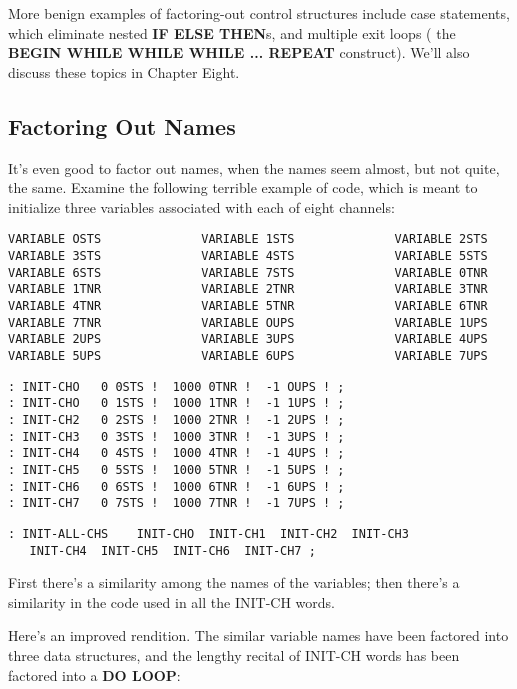 \documentclass{book}
\begin{document}
More benign examples of factoring-out control structures include case statements, which eliminate nested \textbf{IF ELSE THEN}s, and multiple exit loops ( the \textbf{BEGIN WHILE WHILE WHILE ... REPEAT} construct). We'll also discuss these topics in Chapter Eight.

\subsection*{
	\textbf{Factoring Out Names}}

It's even good to factor out names, when the names seem almost, but not quite, the same. Examine the following terrible example of code, which is meant to initialize three variables associated with each of eight channels:

\begin{verbatim} 
VARIABLE OSTS              VARIABLE 1STS              VARIABLE 2STS 
VARIABLE 3STS              VARIABLE 4STS              VARIABLE 5STS
VARIABLE 6STS              VARIABLE 7STS              VARIABLE 0TNR
VARIABLE 1TNR              VARIABLE 2TNR              VARIABLE 3TNR
VARIABLE 4TNR              VARIABLE 5TNR              VARIABLE 6TNR
VARIABLE 7TNR              VARIABLE OUPS              VARIABLE 1UPS
VARIABLE 2UPS              VARIABLE 3UPS              VARIABLE 4UPS
VARIABLE 5UPS              VARIABLE 6UPS              VARIABLE 7UPS
\end{verbatim}

\begin{verbatim} 
: INIT-CHO   0 0STS !  1000 0TNR !  -1 OUPS ! ; 
: INIT-CHO   0 1STS !  1000 1TNR !  -1 1UPS ! ; 
: INIT-CH2   0 2STS !  1000 2TNR !  -1 2UPS ! ; 
: INIT-CH3   0 3STS !  1000 3TNR !  -1 3UPS ! ; 
: INIT-CH4   0 4STS !  1000 4TNR !  -1 4UPS ! ; 
: INIT-CH5   0 5STS !  1000 5TNR !  -1 5UPS ! ; 
: INIT-CH6   0 6STS !  1000 6TNR !  -1 6UPS ! ; 
: INIT-CH7   0 7STS !  1000 7TNR !  -1 7UPS ! ; 
\end{verbatim}

\begin{verbatim} 
: INIT-ALL-CHS    INIT-CHO  INIT-CH1  INIT-CH2  INIT-CH3
   INIT-CH4  INIT-CH5  INIT-CH6  INIT-CH7 ;
\end{verbatim}

\noindent
First there's a similarity among the names of the variables; then there's a similarity in the code used in all the INIT-CH words.

Here's an improved rendition. The similar variable names have been factored into three data structures, and the lengthy recital of INIT-CH words has been factored into a \textbf{DO LOOP}:
\end{document}
